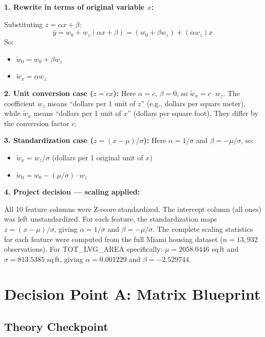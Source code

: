 \documentclass[11pt]{article}
\begin{document}
\textbf{1. Rewrite in terms of original variable $x$:}

Substituting $z = \alpha x + \beta$:
\[
\hat{y} = w_0 + w_z(\alpha x + \beta) = (w_0 + \beta w_z) + (\alpha w_z)x
\]
So:
\begin{itemize}
    \item $\tilde{w}_0 = w_0 + \beta w_z$
    \item $\tilde{w}_x = \alpha w_z$
\end{itemize}

\textbf{2. Unit conversion case ($z = cx$):} Here $\alpha = c$, $\beta = 0$, so $\tilde{w}_x = c \cdot w_z$. The coefficient $w_z$ means ``dollars per 1 unit of $z$'' (e.g., dollars per square meter), while $\tilde{w}_x$ means ``dollars per 1 unit of $x$'' (dollars per square foot). They differ by the conversion factor $c$.

\textbf{3. Standardization case ($z = (x - \mu)/\sigma$):} Here $\alpha = 1/\sigma$ and $\beta = -\mu/\sigma$, so:
\begin{itemize}
    \item $\tilde{w}_x = w_z / \sigma$ \quad (dollars per 1 original unit of $x$)
    \item $\tilde{w}_0 = w_0 - (\mu/\sigma) \cdot w_z$
\end{itemize}

\textbf{4. Project decision --- scaling applied:}

All 10 feature columns were Z-score standardized. The intercept column (all ones) was left unstandardized. For each feature, the standardization maps $z = (x - \mu)/\sigma$, giving $\alpha = 1/\sigma$ and $\beta = -\mu/\sigma$. The complete scaling statistics for each feature were computed from the full Miami housing dataset ($n = 13{,}932$ observations). For TOT\_LVG\_AREA specifically: $\mu = 2058.0446$ sq\,ft and $\sigma = 813.5385$ sq\,ft, giving $\alpha = 0.001229$ and $\beta = -2.529744$.

\section{Decision Point A: Matrix Blueprint}

\subsection*{Theory Checkpoint}
\end{document}
